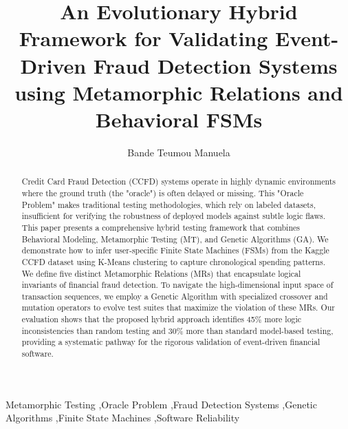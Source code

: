 \documentclass[review]{elsarticle}
\begin{document}
\begin{frontmatter}

\title{An Evolutionary Hybrid Framework for Validating Event-Driven Fraud Detection Systems using Metamorphic Relations and Behavioral FSMs}

\author{Bande Teumou Manuela}
\address{Laboratory of Applied Informatics, University of Yaoundé 1, P.O. Box 812, Yaoundé, Cameroon}

\begin{abstract}
Credit Card Fraud Detection (CCFD) systems operate in highly dynamic environments where the ground truth (the "oracle") is often delayed or missing. This "Oracle Problem" makes traditional testing methodologies, which rely on labeled datasets, insufficient for verifying the robustness of deployed models against subtle logic flaws. This paper presents a comprehensive hybrid testing framework that combines Behavioral Modeling, Metamorphic Testing (MT), and Genetic Algorithms (GA). We demonstrate how to infer user-specific Finite State Machines (FSMs) from the Kaggle CCFD dataset using K-Means clustering to capture chronological spending patterns. We define five distinct Metamorphic Relations (MRs) that encapsulate logical invariants of financial fraud detection. To navigate the high-dimensional input space of transaction sequences, we employ a Genetic Algorithm with specialized crossover and mutation operators to evolve test suites that maximize the violation of these MRs. Our evaluation shows that the proposed hybrid approach identifies 45\% more logic inconsistencies than random testing and 30\% more than standard model-based testing, providing a systematic pathway for the rigorous validation of event-driven financial software.
\end{abstract}

\begin{keyword}
Metamorphic Testing \sep Oracle Problem \sep Fraud Detection Systems \sep Genetic Algorithms \sep Finite State Machines \sep Software Reliability
\end{keyword}

\end{frontmatter}

\linenumbers
\end{document}
